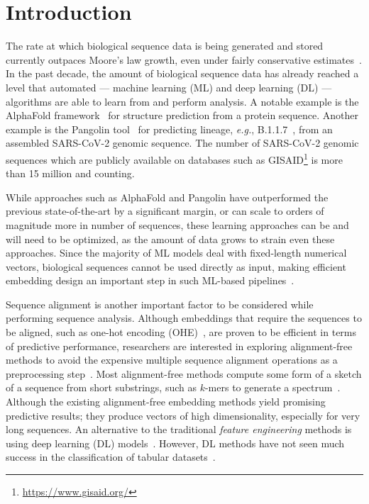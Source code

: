 \documentclass[runningheads]{llncs}
\newcommand{\eg}{\emph{e.g.}}
\begin{document}
\section{Introduction}
The rate at which biological sequence data is being generated and
stored currently outpaces Moore's law growth, even under fairly
conservative estimates~\cite{stephens-2015-genomical}.  In the past
decade, the amount of biological sequence data has already reached a
level that automated --- machine learning (ML) and deep learning (DL)
--- algorithms are able to learn from and perform analysis.  A
notable example is the AlphaFold framework~\cite{AlphaFold2021} for
structure prediction from a protein sequence.  Another example is the
Pangolin tool~\cite{otoole-2021-pangotool} for predicting lineage,
\eg, B.1.1.7~\cite{rambaut-2020-pangonomenclature}, from an assembled
SARS-CoV-2 genomic sequence.  The number of SARS-CoV-2 genomic
sequences which are publicly available on databases such as
GISAID\footnote{\url{https://www.gisaid.org/}} is more than 15 million and counting.



While approaches such as AlphaFold and Pangolin have outperformed the
previous state-of-the-art by a significant margin, or can scale to
orders of magnitude more in number of sequences, these learning
approaches can be and will need to be optimized, as the amount of
data grows to strain even these approaches.
Since the majority of ML models deal with fixed-length numerical
vectors, biological sequences cannot be used directly as input, making efficient embedding design an important step in such ML-based pipelines~\cite{hu2022learning,chourasia2022clustering}. 



Sequence alignment is another important factor to be considered while
performing sequence analysis.  Although embeddings that require the
sequences to be aligned, such as one-hot encoding
(OHE)~\cite{kuzmin2020machine}, are proven to be efficient in terms of
predictive performance, researchers are interested in exploring
alignment-free methods to avoid the expensive
multiple sequence alignment operations as a preprocessing
step~\cite{ali2022evaluating,ali2023characterizing,chourasia2022informative,chowdhury2017review,tayebi2021robust}. Most alignment-free methods compute
some form of a sketch of a sequence from short substrings, such as
$k$-mers to generate a spectrum~\cite{ali2021k}. Although the existing alignment-free
embedding methods yield promising predictive results; they produce vectors of high
dimensionality, especially for very long sequences.
An alternative to the traditional \textit{feature engineering} methods
is using deep learning (DL) models~\cite{ali2022spike2signal}. However, DL methods have not
seen much success in the classification of tabular
datasets~\cite{borisov2021deep,ali2022benchmarking}.
\end{document}
